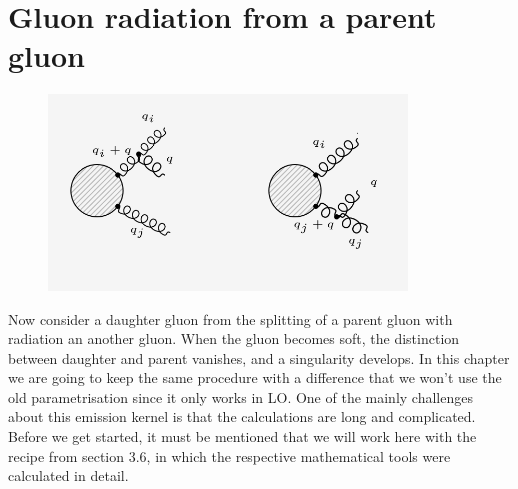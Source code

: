 \section{Gluon radiation from a parent gluon}
\begin{figure}[ht!]
\centering
\includegraphics[width=0.85\textwidth]{images/GG/GGDiagrams.png}
\end{figure}
Now consider a daughter gluon from the splitting of a parent gluon with radiation an another gluon. When the gluon becomes soft, the distinction between daughter and parent vanishes, and a singularity develops. In this chapter we are going to keep the same procedure with a difference that we won't use the old parametrisation since it only works in LO. One of the mainly challenges about this emission kernel is that the calculations are long and complicated. Before we get started, it must be mentioned that we will work here with the recipe from section 3.6, in which the respective mathematical tools were calculated in detail.
\pagebreak
